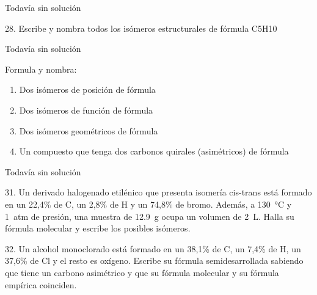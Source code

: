 \documentclass[twocolumn]{article}
\begin{document}
\begin{solution}[print=false]
  Todavía sin solución
\end{solution}

\begin{exercise}
  28. Escribe y nombra todos los isómeros estructurales de fórmula C5H10
\end{exercise}

\begin{solution}[print=false]
  Todavía sin solución
\end{solution}

\begin{exercise}
  Formula y nombra:
  \begin{enumerate}
    \item Dos isómeros de posición de fórmula 
    \item Dos isómeros de función de fórmula 
    \item Dos isómeros geométricos de fórmula 
    \item Un compuesto que tenga dos carbonos quirales (asimétricos) de fórmula 
  \end{enumerate}
\end{exercise}

\begin{solution}[print=false]
  Todavía sin solución
\end{solution}

\begin{exercise}
  31. Un derivado halogenado etilénico que presenta isomería cis-trans
  está formado en un 22,4\% de C, un 2,8\% de H y un
  74,8\% de bromo. Además, a \SI{130}{\celsius} y \SI{1}{atm} de presión, una muestra de \SI{12,9}{\gram} ocupa un volumen de \SI{2}{\liter}. Halla su fórmula molecular y escribe los posibles isómeros.
\end{exercise}

\begin{solution}
\end{solution}

\begin{exercise}
  32. Un alcohol monoclorado está formado en un 38,1\% de C,
  un 7,4\% de H, un 37,6\% de Cl y el resto es oxígeno. Escribe
  su fórmula semidesarrollada sabiendo que tiene un carbono
  asimétrico y que su fórmula molecular y su fórmula empírica
  coinciden.
\end{exercise}

\begin{solution}
\end{solution}
\end{document}
